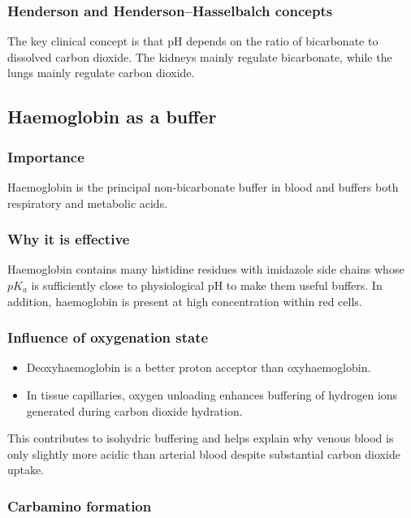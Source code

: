 \documentclass[11pt,a4paper]{article}
\begin{document}
\subsubsection{Henderson and Henderson--Hasselbalch concepts}

The key clinical concept is that pH depends on the ratio of bicarbonate to dissolved carbon dioxide. The kidneys mainly regulate bicarbonate, while the lungs mainly regulate carbon dioxide.

\subsection{Haemoglobin as a buffer}

\subsubsection{Importance}

Haemoglobin is the principal non-bicarbonate buffer in blood and buffers both respiratory and metabolic acids.

\subsubsection{Why it is effective}

Haemoglobin contains many histidine residues with imidazole side chains whose \(pK_a\) is sufficiently close to physiological pH to make them useful buffers. In addition, haemoglobin is present at high concentration within red cells.

\subsubsection{Influence of oxygenation state}

\begin{itemize}
    \item Deoxyhaemoglobin is a better proton acceptor than oxyhaemoglobin.
    \item In tissue capillaries, oxygen unloading enhances buffering of hydrogen ions generated during carbon dioxide hydration.
\end{itemize}

This contributes to isohydric buffering and helps explain why venous blood is only slightly more acidic than arterial blood despite substantial carbon dioxide uptake.

\subsubsection{Carbamino formation}
\end{document}
